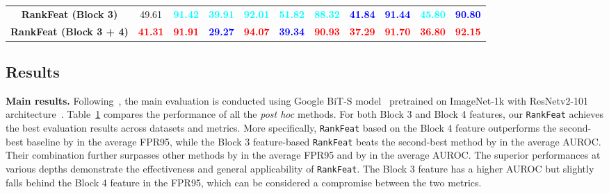 \begin{table}[htbp]
{\begin{tabular}{c|cc|cc|cc|cc|cc}
    \rowcolor{gray!20}\textbf{RankFeat (Block 3)} &{49.61} &\textbf{\textcolor{cyan}{91.42}} &\textbf{\textcolor{cyan}{39.91}} &\textbf{\textcolor{cyan}{92.01}} &\textbf{\textcolor{cyan}{51.82}} &\textbf{\textcolor{cyan}{88.32}} &\textbf{\textcolor{blue}{41.84}} &\textbf{\textcolor{blue}{91.44}} &\textbf{\textcolor{cyan}{45.80}} &\textbf{\textcolor{blue}{90.80}} \\
\rowcolor{gray!20} \textbf{RankFeat (Block 3 + 4)}
     &\textbf{\textcolor{red}{41.31}}&\textbf{\textcolor{red}{91.91}}&\textbf{\textcolor{blue}{29.27}}&\textbf{\textcolor{red}{94.07}}&\textbf{\textcolor{blue}{39.34}}&\textbf{\textcolor{red}{90.93}}&\textbf{\textcolor{red}{37.29}}&\textbf{\textcolor{red}{91.70}}&\textbf{\textcolor{red}{36.80}}&\textbf{\textcolor{red}{92.15}}\\
\bottomrule
    \end{tabular}
    }
    \label{tab:main_results_res101}
\end{table}

\subsection{Results}
\label{sec:exp_result}

\noindent \textbf{Main results.} Following~\cite{huang2021importance}, the main evaluation is conducted using Google BiT-S model~\cite{kolesnikov2020big} pretrained on ImageNet-1k with ResNetv2-101 architecture~\cite{he2016identity}. Table~\ref{tab:main_results_res101} compares the performance of all the \emph{post hoc} methods. For both Block 3 and Block 4 features, our \texttt{RankFeat} achieves the best evaluation results across datasets and metrics. More specifically, \texttt{RankFeat} based on the Block 4 feature outperforms the second-best baseline by  in the average FPR95, while the Block 3 feature-based \texttt{RankFeat} beats the second-best method by  in the average AUROC. Their combination further surpasses other methods by  in the average FPR95 and by  in the average AUROC. The superior performances at various depths demonstrate the effectiveness and general applicability of \texttt{RankFeat}. The Block 3 feature has a higher AUROC but slightly falls behind the Block 4 feature in the FPR95, which can be considered a compromise between the two metrics.






